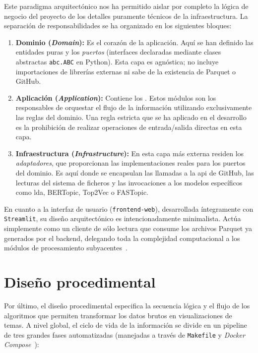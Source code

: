 Este paradigma arquitectónico nos ha permitido aislar por completo la lógica de
negocio del proyecto de los detalles puramente técnicos de la infraestructura.
La separación de responsabilidades se ha organizado en los siguientes bloques:

\begin{enumerate}
    \item \textbf{Dominio (\textit{Domain}):} Es el corazón de la aplicación. Aquí se han definido las entidades puras y los \textit{puertos} (interfaces declaradas mediante clases abstractas \texttt{abc.ABC} en Python). Esta capa es agnóstica; no incluye importaciones de librerías externas ni sabe de la existencia de Parquet o GitHub.
    \item \textbf{Aplicación (\textit{Application}):} Contiene los \textit{}. Estos módulos son los responsables de orquestar el flujo de la información utilizando exclusivamente las reglas del dominio. Una regla estricta que se ha aplicado en el desarrollo es la prohibición de realizar operaciones de entrada/salida directas en esta capa.
    \item \textbf{Infraestructura (\textit{Infrastructure}):} En esta capa más externa residen los \textit{adaptadores}, que proporcionan las implementaciones reales para los puertos del dominio. Es aquí donde se encapsulan las llamadas a la \acrshort{api} de GitHub, las lecturas del sistema de ficheros y las invocaciones a los modelos específicos como \acrshort{lda}, BERTopic, Top2Vec o FASTopic.
\end{enumerate}

En cuanto a la interfaz de usuario (\texttt{frontend-web}), desarrollada
íntegramente con \texttt{Streamlit}, su diseño arquitectónico es
intencionadamente minimalista. Actúa simplemente como un cliente de sólo
lectura que consume los archivos Parquet ya generados por el backend,
delegando toda la complejidad computacional a los módulos de procesamiento
subyacentes~\cite{StreamlitDocsa}.


\section{Diseño procedimental}
Por último, el diseño procedimental especifica la secuencia lógica y el flujo
de los algoritmos que permiten transformar los datos brutos en visualizaciones
de temas. A nivel global, el ciclo de vida de la información se divide en un
\gls{pipeline} de tres grandes fases automatizadas (manejadas a través de
\texttt{Makefile} y \textit{Docker Compose}~\cite{DockerManuals}):

